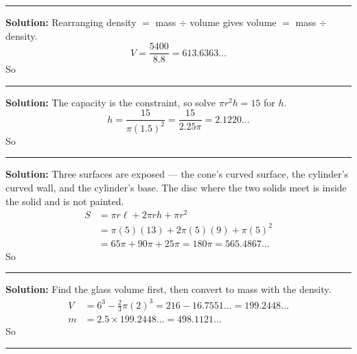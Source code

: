 \documentclass[12pt]{article}
\begin{document}
\vspace{0.2cm}\noindent\rule{\linewidth}{0.2pt}


\textbf{Solution:} Rearranging density $=$ mass $\div$ volume gives volume $=$ mass $\div$ density.
\[ V = \frac{5400}{8.8} = 613.6363\ldots \]
So 

\vspace{0.2cm}\noindent\rule{\linewidth}{0.2pt}


\textbf{Solution:} The capacity is the constraint, so solve $\pi r^2 h = 15$ for $h$.
\[ h = \frac{15}{\pi (1.5)^2} = \frac{15}{2.25\pi} = 2.1220\ldots \]
So 

\vspace{0.2cm}\noindent\rule{\linewidth}{0.2pt}


\textbf{Solution:} Three surfaces are exposed --- the cone's curved surface, the cylinder's curved wall, and the cylinder's base. The disc where the two solids meet is inside the solid and is not painted.
\begin{align*}
  S &= \pi r \ell + 2\pi r h + \pi r^2 \\
    &= \pi (5)(13) + 2\pi (5)(9) + \pi (5)^2 \\
    &= 65\pi + 90\pi + 25\pi = 180\pi = 565.4867\ldots
\end{align*}
So 

\vspace{0.2cm}\noindent\rule{\linewidth}{0.2pt}


\textbf{Solution:} Find the glass volume first, then convert to mass with the density.
\begin{align*}
  V &= 6^3 - \tfrac{2}{3}\pi (2)^3 = 216 - 16.7551\ldots = 199.2448\ldots \\
  m &= 2.5 \times 199.2448\ldots = 498.1121\ldots
\end{align*}
So 

\vspace{0.2cm}\noindent\rule{\linewidth}{0.2pt}
\end{document}
